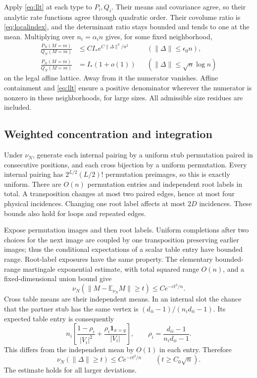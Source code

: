\documentclass[11pt]{article}
\newcommand{\E}{\mathbb E}
\newcommand{\one}{\mathbf 1}
\begin{document}
Apply \eqref{eq:llt} at each type to $P_i,Q_i$. Their means and covariance agree, so their analytic rate functions agree through quadratic order. Their covolume ratio is \eqref{eq:localindex}, and the determinant ratio stays bounded and tends to one at the mean. Multiplying over $n_i=\alpha_i n$ gives, for some fixed neighborhood,
\begin{align}
 \frac{P_N(M=m)}{Q_N(M=m)}&\le C I_*e^{C\|\Delta\|^3/n^2}
 &&(\|\Delta\|\le\epsilon_0n),\label{eq:cubic}\\
 \frac{P_N(M=m)}{Q_N(M=m)}&=I_*(1+o(1))
 &&(\|\Delta\|\le\sqrt n\log n)\label{eq:ratio}
\end{align}
on the legal affine lattice. Away from it the numerator vanishes. Affine containment and \eqref{eq:llt} ensure a positive denominator wherever the numerator is nonzero in these neighborhoods, for large sizes. All admissible size residues are included.

\subsection*{Weighted concentration and integration}
Under $\nu_N$, generate each internal pairing by a uniform stub permutation paired in consecutive positions, and each cross bijection by a uniform permutation. Every internal pairing has $2^{L/2}(L/2)!$ permutation preimages, so this is exactly uniform. There are $O(n)$ permutation entries and independent root labels in total. A transposition changes at most two paired edges, hence at most four physical incidences. Changing one root label affects at most $2D$ incidences. These bounds also hold for loops and repeated edges.

Expose permutation images and then root labels. Uniform completions after two choices for the next image are coupled by one transposition preserving earlier images; thus the conditional expectations of a scalar table entry have bounded range. Root-label exposures have the same property. The elementary bounded-range martingale exponential estimate, with total squared range $O(n)$, and a fixed-dimensional union bound give
\[
 \nu_N(\|M-\E_{\nu_N}M\|\ge t)\le Ce^{-ct^2/n}.
\]
Cross table means are their independent means. In an internal slot the chance that the partner stub has the same vertex is $(d_{ii}-1)/(n_id_{ii}-1)$. Its expected table entry is consequently
\[
 n_i\left[\frac{1-\rho_i}{|V_i|^2}
       +\frac{\rho_i\one_{x=y}}{|V_i|}\right],
 \qquad\rho_i=\frac{d_{ii}-1}{n_id_{ii}-1}.
\]
This differs from the independent mean by $O(1)$ in each entry. Therefore
\begin{equation}\label{eq:tail}
 \nu_N(\|\Delta\|\ge t)\le Ce^{-ct^2/n}\qquad(t\ge C_0\sqrt n).
\end{equation}
The estimate holds for all larger deviations.
\end{document}
